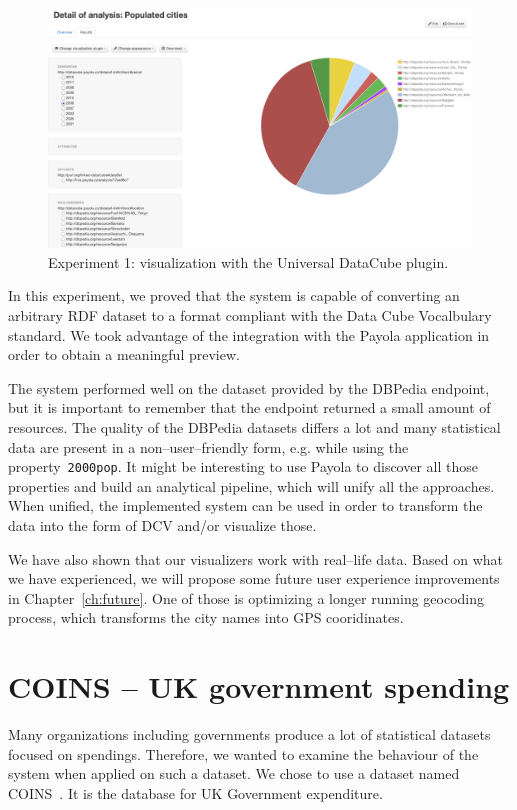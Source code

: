 \begin{figure}
  \centering
  \includegraphics[width=140mm]{img/payola-exp-01-vis2.png}
  \caption{Experiment 1: visualization with the Universal DataCube plugin.}
  \label{fig:payola-exp-01-vis2}
\end{figure}

In this experiment, we proved that the system is capable of converting an 
arbitrary RDF dataset to a format compliant with the Data Cube Vocalbulary 
standard. We took advantage of the integration with the Payola application in 
order to obtain a meaningful preview.

The system performed well on the dataset provided by the DBPedia endpoint, but 
it is important to remember that the endpoint returned a small amount of 
resources. The quality of the DBPedia datasets differs a lot and many 
statistical data are present in a non--user--friendly form, e.g. while using the 
property~\texttt{2000pop}. It might be interesting to use Payola to discover 
all those properties and build an analytical pipeline, which will unify all the 
approaches. When unified, the implemented system can be used in order to 
transform the data into the form of DCV and/or visualize those.

We have also shown that our visualizers work with real--life data. Based on 
what we have experienced, we will propose some future user experience 
improvements in Chapter~\ref{ch:future}. One of those is optimizing a longer running 
geocoding process, which transforms the city names into GPS cooridinates.

\section{COINS -- UK government spending}
Many organizations including governments produce a lot of statistical datasets 
focused on spendings. Therefore, we wanted to examine the behaviour of the 
system when applied on such a dataset. We chose to use a dataset named 
COINS~\cite{coins}. It is the database for UK Government expenditure.

